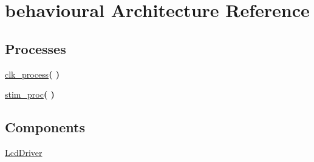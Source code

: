 \hypertarget{classtestbenchLcd_1_1behavioural}{}\section{behavioural Architecture Reference}
\label{classtestbenchLcd_1_1behavioural}
\subsection*{Processes}
 \begin{DoxyCompactItemize}
\item 
\mbox{\label{classtestbenchLcd_1_1behavioural_ac5bb218131b813f7908ec89476b31fca}} 
\hyperlink{classtestbenchLcd_1_1behavioural_ac5bb218131b813f7908ec89476b31fca}{clk\+\_\+process}{\bfseries  (  )}
\item 
\mbox{\label{classtestbenchLcd_1_1behavioural_ad2efa6785cff833c341e27596b21aeb5}} 
\hyperlink{classtestbenchLcd_1_1behavioural_ad2efa6785cff833c341e27596b21aeb5}{stim\+\_\+proc}{\bfseries  (  )}
\end{DoxyCompactItemize}
\subsection*{Components}
 \begin{DoxyCompactItemize}
\item 
\mbox{\label{classtestbenchLcd_1_1behavioural_a5e2a49dd2fe0e7f1237968d671f2ef86}} 
\hyperlink{classtestbenchLcd_1_1behavioural_a5e2a49dd2fe0e7f1237968d671f2ef86}{Lcd\+Driver}  {\bfseries }  
\end{DoxyCompactItemize}
